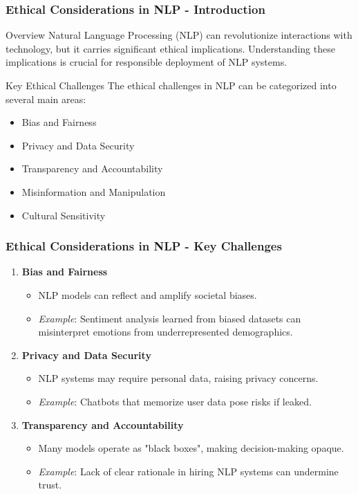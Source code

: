 \documentclass[aspectratio=169]{beamer}
\begin{document}
\begin{frame}[fragile]
    \frametitle{Ethical Considerations in NLP - Introduction}
    \begin{block}{Overview}
        Natural Language Processing (NLP) can revolutionize interactions with technology, but it carries significant ethical implications. Understanding these implications is crucial for responsible deployment of NLP systems.
    \end{block}

    \begin{block}{Key Ethical Challenges}
        The ethical challenges in NLP can be categorized into several main areas:
        \begin{itemize}
            \item Bias and Fairness
            \item Privacy and Data Security
            \item Transparency and Accountability
            \item Misinformation and Manipulation
            \item Cultural Sensitivity
        \end{itemize}
    \end{block}
\end{frame}

\begin{frame}[fragile]
    \frametitle{Ethical Considerations in NLP - Key Challenges}
    \begin{enumerate}
        \item \textbf{Bias and Fairness} 
        \begin{itemize}
            \item NLP models can reflect and amplify societal biases.
            \item \textit{Example}: Sentiment analysis learned from biased datasets can misinterpret emotions from underrepresented demographics.
        \end{itemize}
        
        \item \textbf{Privacy and Data Security} 
        \begin{itemize}
            \item NLP systems may require personal data, raising privacy concerns.
            \item \textit{Example}: Chatbots that memorize user data pose risks if leaked.
        \end{itemize}

        \item \textbf{Transparency and Accountability} 
        \begin{itemize}
            \item Many models operate as "black boxes", making decision-making opaque.
            \item \textit{Example}: Lack of clear rationale in hiring NLP systems can undermine trust.
        \end{itemize}
    \end{enumerate}
\end{frame}
\end{document}
